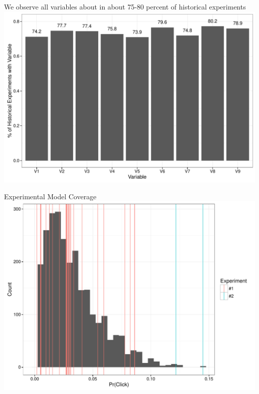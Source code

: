 \documentclass[11pt,xcolor=svgnames]{beamer}
\begin{document}

\begin{frame}
We observe all variables about in about 75-80 percent of historical experiments
\includegraphics[width=\textwidth]{hist_freq.pdf}
\end{frame}

\begin{frame}
Experimental Model Coverage
\includegraphics[width=\textwidth]{hist.pdf}
\end{frame}
\end{document}
